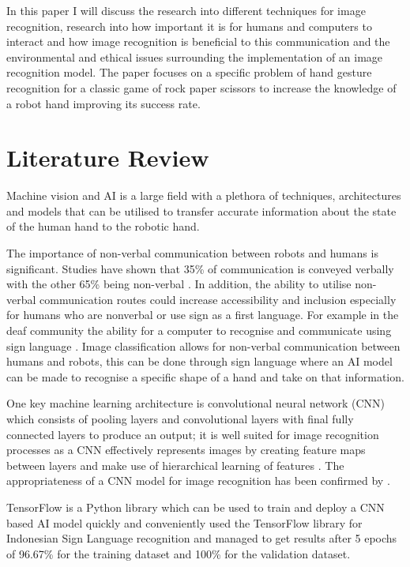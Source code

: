 \documentclass[conference]{IEEEtran}
\begin{document}
In this paper I will discuss the research into different techniques for image recognition, research into how important it is for humans and computers to interact and how image recognition is beneficial to this communication and the environmental and ethical issues surrounding the implementation of an image recognition model. 
The paper focuses on a specific problem of hand gesture recognition for a classic game of rock paper scissors to increase the knowledge of a robot hand improving its success rate.


\section{Literature Review}

Machine vision and AI is a large field with a plethora of techniques, architectures and models that can be utilised to transfer accurate information about the state of the human hand to the robotic hand.

The importance of non-verbal communication between robots and humans is significant. Studies have shown that 35\% of communication is conveyed verbally with the other 65\% being non-verbal \cite{intelligentNetwork:2008}. In addition, the ability to utilise non-verbal communication routes could increase accessibility and inclusion especially for humans who are nonverbal or use sign as a first language. For example in the deaf community the ability for a computer to recognise and communicate using sign language \cite{sign:2019}. Image classification allows for non-verbal communication between humans and robots, this can be done through sign language where an AI model can be made to recognise a specific shape of a hand and take on that information. \cite{gesture:communication:2020}

One key machine learning architecture is convolutional neural network (CNN) which consists of pooling layers and convolutional layers with final fully connected layers to produce an output; it is well suited for image recognition processes as a CNN effectively represents images by creating feature maps between layers and make use of hierarchical learning of features \cite{SAM:2023}. The appropriateness of a CNN model for image recognition has been confirmed by \cite{10.1007/978-3-319-10590-1_53}. 

TensorFlow is a Python library which can be used to train and deploy a CNN based AI model quickly and conveniently \cite{indonesian:sign:2020} used the TensorFlow library for Indonesian Sign Language recognition and managed to get results after 5 epochs of 96.67\% for the training dataset and 100\% for the validation dataset. 
\end{document}
